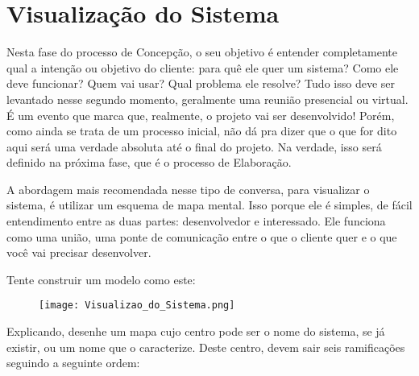 \section*{Visualização do Sistema}

Nesta fase do processo de Concepção, o seu objetivo é entender completamente qual a intenção ou objetivo do cliente: para quê ele quer um sistema? Como ele deve funcionar? Quem vai usar? Qual problema ele resolve? Tudo isso deve ser levantado nesse segundo momento, geralmente uma reunião presencial ou virtual. É um evento que marca que, realmente, o projeto vai ser desenvolvido! Porém, como ainda se trata de um processo inicial, não dá pra dizer que o que for dito aqui será uma verdade absoluta até o final do projeto. Na verdade, isso será definido na próxima fase, que é o processo de Elaboração.

A abordagem mais recomendada nesse tipo de conversa, para visualizar o sistema, é utilizar um esquema de mapa mental. Isso porque ele é simples, de fácil entendimento entre as duas partes: desenvolvedor e interessado. Ele funciona como uma união, uma ponte de comunicação entre o que o cliente quer e o que você vai precisar desenvolver.

Tente construir um modelo como este:

\begin{figure}[H]
	\centering
	\texttt{[image: Visualizao\_do\_Sistema.png]}
\end{figure}

Explicando, desenhe um mapa cujo centro pode ser o nome do sistema, se já existir, ou um nome que o caracterize. Deste centro, devem sair seis ramificações seguindo a seguinte ordem:


